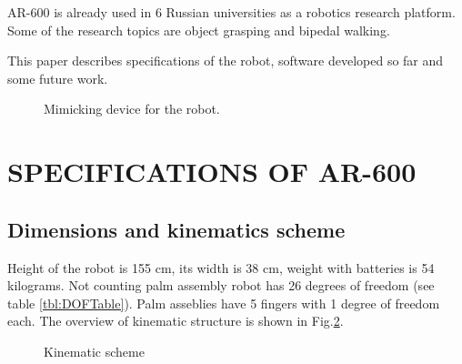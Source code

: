 \documentclass[letterpaper, 10 pt, conference]{ieeeconf}  %
\begin{document}
AR-600 is already used in 6 Russian universities as a robotics research
platform. Some of the research topics are object grasping and bipedal walking.

This paper describes specifications of the robot, software developed so far and
some future work.

\begin{figure} [thpb]
      \centering
      \caption{Mimicking device for the robot.}
      \label{img:suit}
\end{figure}

\section{SPECIFICATIONS OF AR-600}

\subsection{Dimensions and kinematics scheme}

Height of the robot is 155 cm, its width is 38 cm, weight with batteries is 54
kilograms.
Not counting palm assembly robot has 26 degrees of freedom (see table
\ref{tbl:DOFTable}).
Palm asseblies have 5 fingers with 1 degree of freedom each. The overview of
kinematic structure is shown in Fig.\ref{img:kinematic}.

 \begin{figure}[thpb]
      \centering
      \caption{Kinematic scheme}
      \label{img:kinematic}
   \end{figure}
 
\end{document}
